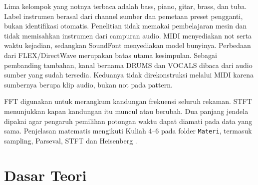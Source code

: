Lima kelompok yang notnya terbaca adalah bass, piano, gitar, brass,
dan tuba. Label instrumen berasal dari channel sumber dan pemetaan
preset pengganti, bukan identifikasi otomatis. Penelitian tidak memakai
pembelajaran mesin dan tidak memisahkan instrumen dari campuran audio.
MIDI menyediakan not serta waktu kejadian, sedangkan SoundFont
menyediakan model bunyinya. Perbedaan dari FLEX/DirectWave merupakan
batas utama kesimpulan. Sebagai pembanding tambahan, kanal bernama
DRUMS dan VOCALS dibaca dari audio sumber yang sudah tersedia.
Keduanya tidak direkonstruksi melalui MIDI karena sumbernya berupa
klip audio, bukan not pada pattern.

FFT digunakan untuk merangkum kandungan frekuensi seluruh rekaman.
STFT menunjukkan kapan kandungan itu muncul atau berubah. Dua panjang
jendela dipakai agar pengaruh pemilihan potongan waktu dapat diamati
pada data yang sama. Penjelasan matematis mengikuti Kuliah 4--6 pada
folder \texttt{Materi}, termasuk sampling, Parseval, STFT dan
Heisenberg \cite{kuliah4,kuliah5,kuliah6}.

\section{Dasar Teori}
